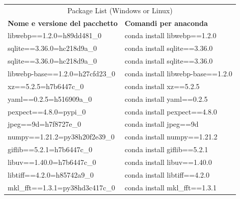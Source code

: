 \begin{table}
\begin{tabular}{ |p{8cm}||p{8cm}|  }




\multicolumn{2}{|c|}{Package List (Windows or Linux)} \\


\textbf{Nome e versione del pacchetto}& \textbf{Comandi per anaconda}\\


libwebp==1.2.0=h89dd481\_0&conda install libwebp==1.2.0  \\



sqlite==3.36.0=hc218d9a\_0&conda install sqlite==3.36.0\\



  sqlite==3.36.0=hc218d9a\_0&	conda install sqlite==3.36.0\\


libwebp-base==1.2.0=h27cfd23\_0&conda install libwebp-base==1.2.0\\


  xz==5.2.5=h7b6447c\_0&	conda install xz==5.2.5\\


  yaml==0.2.5=h516909a\_0&	conda install yaml==0.2.5\\


  pexpect==4.8.0=pypi\_0&	conda install pexpect==4.8.0\\



  jpeg==9d=h7f8727e\_0&	conda install jpeg==9d\\



  numpy==1.21.2=py38h20f2e39\_0&	conda install numpy==1.21.2\\




  giflib==5.2.1=h7b6447c\_0&conda install giflib==5.2.1\\



  libuv==1.40.0=h7b6447c\_0&	conda install libuv==1.40.0\\




  libtiff==4.2.0=h85742a9\_0&	conda install libtiff==4.2.0\\



  mkl\_fft==1.3.1=py38hd3c417c\_0&	conda install mkl\_fft==1.3.1\\




\end{tabular}
\end{table}
